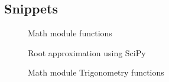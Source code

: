   \subsection{Snippets}
  \vspace{2em}
    \begin{figure}[h!]
      \centering
      \caption{Math module functions}
      \label{fig:Library functions for math}
    \end{figure}

    \begin{figure}[h!]
      \centering
      \caption{Root approximation using SciPy}
      \label{fig:SciPy Root Approximation}
    \end{figure}

    \begin{figure}[h!]
      \centering
      \caption{Math module Trigonometry functions}
      \label{fig:Math trigonometry functions}
    \end{figure}
    \pagebreak

